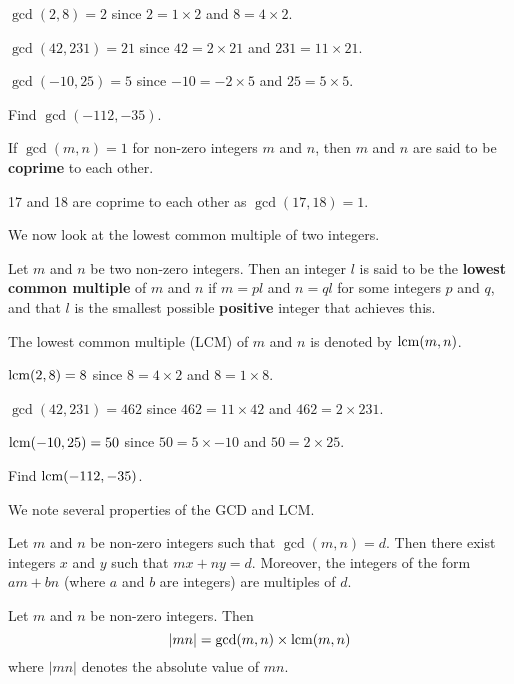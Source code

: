 \begin{example}
    $\gcd(2, 8) = 2$ since $2 = 1 \times 2$ and $8 = 4 \times 2$.
\end{example}
\begin{example}
    $\gcd(42, 231) = 21$ since $42 = 2 \times 21$ and $231 = 11 \times 21$.
\end{example}
\begin{example}
    $\gcd(-10, 25) = 5$ since $-10 = -2 \times 5$ and $25 = 5 \times 5$.
\end{example}
\begin{exercise}
    Find $\gcd(-112, -35)$.
\end{exercise}

\begin{remark}
    If $\gcd(m, n) = 1$ for non-zero integers $m$ and $n$, then $m$ and $n$ are said to be \textbf{coprime} to each other.
\end{remark}
\begin{example}
    17 and 18 are coprime to each other as $\gcd(17, 18) = 1$.
\end{example}

We now look at the lowest common multiple of two integers.
\begin{definition}
    Let $m$ and $n$ be two non-zero integers. Then an integer $l$ is said to be the \textbf{lowest common multiple} of $m$ and $n$ if $m = pl$ and $n = ql$ for some integers $p$ and $q$, and that $l$ is the smallest possible \textbf{positive} integer that achieves this.
\end{definition}
The lowest common multiple (LCM) of $m$ and $n$ is denoted by $\mathrm{lcm}(m,n)$.

\begin{example}
    $\mathrm{lcm}(2, 8) = 8$ since $8 = 4 \times 2$ and $8 = 1 \times 8$.
\end{example}
\begin{example}
    $\gcd(42, 231) = 462$ since $462 = 11 \times 42$ and $462 = 2 \times 231$.
\end{example}
\begin{example}
    $\mathrm{lcm}(-10, 25) = 50$ since $50 = 5 \times -10$ and $50 = 2 \times 25$.
\end{example}
\begin{exercise}
    Find $\mathrm{lcm}(-112, -35)$.
\end{exercise}

\newpage

We note several properties of the GCD and LCM.
\begin{lemma}[B\'{e}zout]\label{lemma-bezout}
    Let $m$ and $n$ be non-zero integers such that $\gcd(m, n) = d$. Then there exist integers $x$ and $y$ such that $mx + ny = d$. Moreover, the integers of the form $am + bn$ (where $a$ and $b$ are integers) are multiples of $d$.
\end{lemma}
\begin{proposition}
    Let $m$ and $n$ be non-zero integers. Then
    \[
        |mn| = \gcd(m,n) \times \mathrm{lcm}(m,n)    
    \]
    where $|mn|$ denotes the absolute value of $mn$.
\end{proposition}

